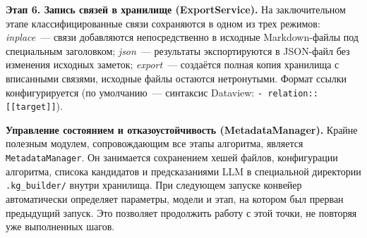 \textbf{Этап 6. Запись связей в хранилище (ExportService).}
На заключительном этапе классифицированные связи сохраняются в одном из трех режимов:
\textit{inplace}~--- связи добавляются непосредственно в исходные Markdown-файлы под специальным заголовком;
\textit{json}~--- результаты экспортируются в JSON-файл без изменения исходных заметок;
\textit{export}~--- создаётся полная копия хранилища с вписанными связями, исходные файлы остаются нетронутыми.
Формат ссылки конфигурируется (по умолчанию~--- синтаксис Dataview: \texttt{- relation:: [[target]]}).

\textbf{Управление состоянием и отказоустойчивость (MetadataManager).}
Крайне полезным модулем, сопровождающим все этапы алгоритма, является \texttt{MetadataManager}.
Он занимается сохранением хешей файлов, конфигурации алгоритма, списока кандидатов 
и предсказаниями LLM в специальной директории \texttt{.kg\_builder/} внутри хранилища.
При следующем запуске конвейер автоматически определяет параметры, модели и этап, на котором был прерван предыдущий запуск.
Это позволяет продолжить работу с этой точки, не повторяя уже выполненных шагов.
